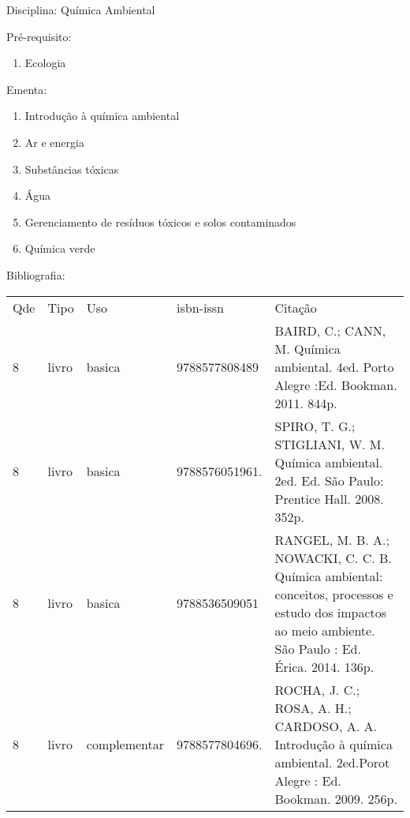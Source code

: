 \documentclass[12pt,a4paper,twoside]{report}
\begin{document}
Disciplina: Química Ambiental

Pré-requisito:
\begin{enumerate}
\item Ecologia
\end{enumerate}

Ementa:
\begin{enumerate}
\item Introdução à química ambiental
\item Ar e energia
\item Substâncias tóxicas
\item Água
\item Gerenciamento de resíduos tóxicos e solos contaminados
\item Química verde
\end{enumerate}

Bibliografia:
\begin{tabular}{lllll}
Qde & Tipo & Uso & isbn-issn & Citação \\
8&livro&basica&9788577808489&BAIRD, C.; CANN, M. Química ambiental. 4ed. Porto Alegre :Ed. Bookman. 2011. 844p.\\
8&livro&basica&9788576051961.&SPIRO, T. G.; STIGLIANI, W. M. Química ambiental. 2ed. Ed. São Paulo: Prentice Hall. 2008. 352p.\\
8&livro&basica&9788536509051&RANGEL, M. B. A.; NOWACKI, C. C. B. Química ambiental: conceitos, processos e estudo dos impactos ao meio ambiente. São Paulo : Ed. Érica. 2014. 136p.\\
8&livro&complementar&9788577804696.&ROCHA, J. C.; ROSA, A. H.; CARDOSO, A. A. Introdução à química ambiental. 2ed.Porot Alegre : Ed. Bookman. 2009. 256p.\\
\end{tabular}
\end{document}
